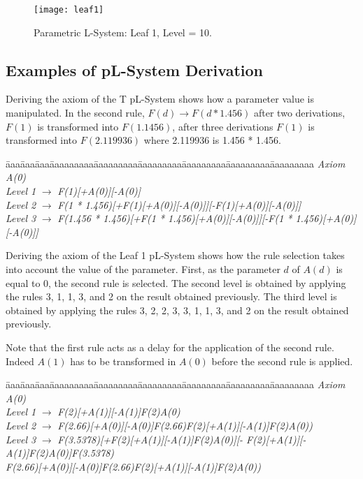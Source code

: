 \begin{figure}[!htbp]
\centerline{\texttt{[image: leaf1]}}
\caption{Parametric L-System: Leaf 1, Level = 10.}
\label{fig:leaf1}
\end{figure}





\subsection{Examples of pL-System Derivation}

Deriving the axiom of the T pL-System shows how a parameter value is
manipulated. In the second rule, $F(d) \rightarrow F(d * 1.456)$ after
two derivations, $F(1)$ is transformed into $F(1.1456)$, after three
derivations $F(1)$ is transformed into $F(2.119936)$ where 2.119936 is
1.456 * 1.456. 

\begin{tabbing}
\=aaa\=aaa\=aaa\=aaaaaaaaa\=aaaaaaaaa\=aaaaaaaaa\=aaaaaaaaa\=aaaaaaaaa\=aaaaaaaaa\kill
\>\>\> \emph{Axiom} \>\> \emph{A(0)}\\
\>\>\> \emph{Level 1} \>\> $\rightarrow$ \emph{F(1)[+A(0)][-A(0)]}\\
\>\>\> \emph{Level 2} \>\> $\rightarrow$ \emph{F(1 * 1.456)[+F(1)[+A(0)][-A(0)]][-F(1)[+A(0)][-A(0)]]}\\
\>\>\> \emph{Level 3} \>\> $\rightarrow$ \emph{F(1.456 * 1.456)[+F(1 * 1.456)[+A(0)][-A(0)]][-F(1 * 1.456)[+A(0)][-A(0)]]}\\
\end{tabbing}

\noindent
Deriving the axiom of the Leaf 1 pL-System shows how the rule
selection takes into account the value of the parameter. First, as the
parameter $d$ of $A(d)$ is equal to 0, the second rule is
selected. The second level is obtained by applying the rules 3, 1, 1,
3, and 2 on the result obtained previously. The third level is
obtained by applying the rules 3, 2, 2, 3, 3, 1, 1, 3, and 2 on the
result obtained previously.

Note that the first rule acts as a delay for the application of the
second rule. Indeed $A(1)$ has to be transformed in $A(0)$ before the
second rule is applied.

\begin{tabbing}
\=aaa\=aaa\=aaa\=aaaaaaaaa\=aaaaaaaaa\=aaaaaaaaa\=aaaaaaaaa\=aaaaaaaaa\=aaaaaaaaa\kill
\>\>\> \emph{Axiom} \>\> \emph{A(0)}\\
\>\>\> \emph{Level 1} \>\> $\rightarrow$ \emph{F(2)[+A(1)][-A(1)]F(2)A(0)}\\
\>\>\> \emph{Level 2} \>\> $\rightarrow$ \emph{F(2.66)[+A(0)][-A(0)]F(2.66)F(2)[+A(1)][-A(1)]F(2)A(0))}\\
\>\>\> \emph{Level 3} \>\> $\rightarrow$ \emph{F(3.5378)[+F(2)[+A(1)][-A(1)]F(2)A(0)][- F(2)[+A(1)][-A(1)]F(2)A(0)]F(3.5378)}\\
\>\>\>\>\>\emph{F(2.66)[+A(0)][-A(0)]F(2.66)F(2)[+A(1)][-A(1)]F(2)A(0))}
\end{tabbing}


